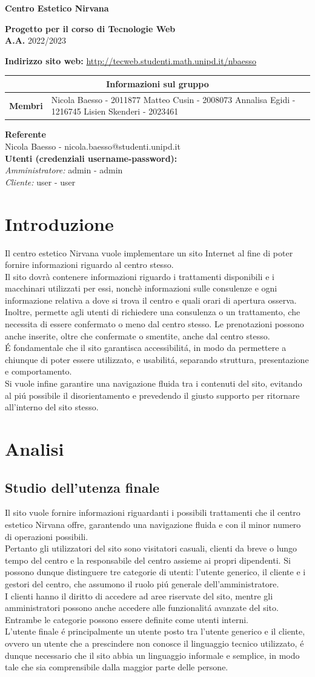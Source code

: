 \documentclass[]{article}
\makeatletter
\newcommand{\copertina}{
	\begin{titlepage}
		\begin{center}
			
			\vspace{1cm}
			
			\begin{Huge}
				\textbf{Centro Estetico Nirvana} \\
			\end{Huge}
			
			\vspace{9pt}  
			
			\begin{large}
				\textbf{Progetto per il corso di Tecnologie Web\\}
				\textbf{A.A.} 2022/2023\\
				\vspace{3pt}
			\end{large}	  
			
			\vspace{24pt}
			
			\begin{large}
				\textbf{Indirizzo sito web:} \href{http://tecweb.studenti.math.unipd.it/nbaesso}{http://tecweb.studenti.math.unipd.it/nbaesso}\\
			\end{large} 
			
			\vspace{10pt} 
			
			\bgroup
			\def\arraystretch{1.3}
			\centering
			\begin{tabular}{r|L{5cm}}
			\multicolumn{2}{c}{\textbf{Informazioni sul gruppo} } \\ \hline
			\textbf{Membri} &  Nicola Baesso - 2011877 \newline Matteo Cusin - 2008073 \newline Annalisa Egidi - 1216745 \newline Lisien Skenderi - 2023461\\
			\end{tabular}
			\egroup
			
			\begin{center}
				\textbf{Referente\\}
				Nicola Baesso - nicola.baesso@studenti.unipd.it\\
				\textbf{Utenti (credenziali username-password):\\}
				\textit{Amministratore:} admin - admin\\
				\textit{Cliente:} user - user\\
			\end{center}
			
		\end{center}
	\end{titlepage}
}	%
\makeatother
\begin{document}
\copertina
\tableofcontents
\newpage
\section{Introduzione}
Il centro estetico Nirvana vuole implementare un sito Internet al fine di poter fornire informazioni riguardo al centro stesso.\\
Il sito dovrà contenere informazioni riguardo i trattamenti disponibili e i macchinari utilizzati per essi, nonchè informazioni sulle consulenze e ogni informazione relativa a dove si trova il centro e quali orari di apertura osserva.\\
Inoltre, permette agli utenti di richiedere una consulenza o un trattamento, che necessita di essere confermato o meno dal centro stesso. Le prenotazioni possono anche inserite, oltre che confermate o smentite, anche dal centro stesso.\\
É fondamentale che il sito garantisca accessibilitá, in modo da permettere a chiunque di poter essere utilizzato, e usabilitá, separando struttura, presentazione e comportamento.\\
Si vuole infine garantire una navigazione fluida tra i contenuti del sito, evitando al piú possibile il disorientamento e prevedendo il giusto supporto per ritornare all'interno del sito stesso.\\
\section{Analisi}
\subsection{Studio dell'utenza finale}
\label{analisi:utenza}
Il sito vuole fornire informazioni riguardanti i possibili trattamenti che il centro estetico Nirvana offre, garantendo una navigazione fluida e con il minor numero di operazioni possibili.\\
Pertanto gli utilizzatori del sito sono visitatori casuali, clienti da breve o lungo tempo del centro e la responsabile del centro assieme ai propri dipendenti.
Si possono dunque distinguere tre categorie di utenti: l'utente generico, il cliente e i gestori del centro, che assumono il ruolo piú generale dell'amministratore.\\
I clienti hanno il diritto di accedere ad aree riservate del sito, mentre gli amministratori possono anche accedere alle funzionalitá avanzate del sito. Entrambe le categorie possono essere definite come utenti interni.\\
L'utente finale é principalmente un utente posto tra l'utente generico e il cliente, ovvero un utente che a prescindere non conosce il linguaggio tecnico utilizzato, é dunque necessario che il sito abbia un linguaggio informale e semplice, in modo tale che sia comprensibile dalla maggior parte delle persone.
\end{document}
